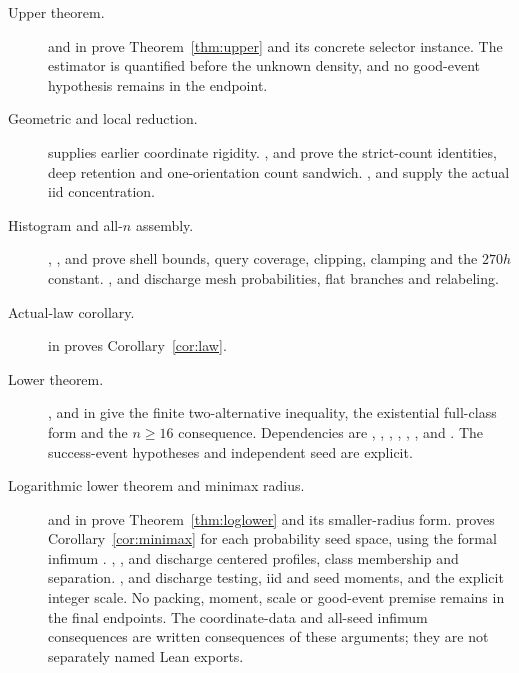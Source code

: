 \documentclass[11pt]{article}
\theoremstyle{remark}
\begin{document}
\begin{description}
\item[Upper theorem.]
 and
 in
 prove Theorem~\ref{thm:upper} and its
concrete selector instance. The estimator is quantified before the
unknown density, and no good-event hypothesis remains in the endpoint.
\item[Geometric and local reduction.]
 supplies earlier coordinate rigidity.
,  and
 prove the strict-count identities,
deep retention and one-orientation count sandwich.
,  and
 supply the actual iid concentration.
\item[Histogram and all-$n$ assembly.]
, ,
 and  prove
shell bounds, query coverage, clipping, clamping and the $270h$ constant.
,
 and  discharge
mesh probabilities, flat branches and relabeling.
\item[Actual-law corollary.]
 in
 proves Corollary~\ref{cor:law}.
\item[Lower theorem.]
,
 and
 in 
give the finite two-alternative inequality, the existential full-class
form and the $n\ge16$ consequence. Dependencies are
, ,
, ,
, ,
 and .
The success-event hypotheses and independent seed are explicit.
\item[Logarithmic lower theorem and minimax radius.]
 and
 in 
prove Theorem~\ref{thm:loglower} and its smaller-radius form.
 proves
Corollary~\ref{cor:minimax} for each probability seed space, using the
formal infimum .
, ,
 and 
discharge centered profiles, class membership and separation.
,  and
 discharge testing, iid and seed moments,
and the explicit integer scale. No packing, moment, scale or
good-event premise remains in the final endpoints. The coordinate-data
and all-seed infimum consequences are written consequences of these
arguments; they are not separately named Lean exports.
\end{description}
\end{document}
